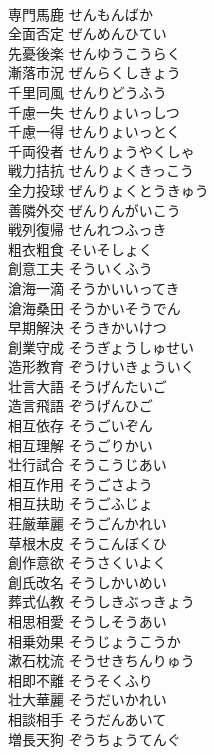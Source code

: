 \documentclass[8pt]{extreport}
\begin{document}
\begin{CJK}{UTF8}{min}
\\	専門馬鹿	せんもんばか	
\\	全面否定	ぜんめんひてい	
\\	先憂後楽	せんゆうこうらく	
\\	漸落市況	ぜんらくしきょう	
\\	千里同風	せんりどうふう	
\\	千慮一失	せんりょいっしつ	
\\	千慮一得	せんりょいっとく	
\\	千両役者	せんりょうやくしゃ	
\\	戦力拮抗	せんりょくきっこう	
\\	全力投球	ぜんりょくとうきゅう	
\\	善隣外交	ぜんりんがいこう	
\\	戦列復帰	せんれつふっき	
\\	粗衣粗食	そいそしょく	
\\	創意工夫	そういくふう	
\\	滄海一滴	そうかいいってき	
\\	滄海桑田	そうかいそうでん	
\\	早期解決	そうきかいけつ	
\\	創業守成	そうぎょうしゅせい	
\\	造形教育	ぞうけいきょういく	
\\	壮言大語	そうげんたいご	
\\	造言飛語	ぞうげんひご	
\\	相互依存	そうごいぞん	
\\	相互理解	そうごりかい	
\\	壮行試合	そうこうじあい	
\\	相互作用	そうごさよう	
\\	相互扶助	そうごふじょ	
\\	荘厳華麗	そうごんかれい	
\\	草根木皮	そうこんぼくひ	
\\	創作意欲	そうさくいよく	
\\	創氏改名	そうしかいめい	
\\	葬式仏教	そうしきぶっきょう	
\\	相思相愛	そうしそうあい	
\\	相乗効果	そうじょうこうか	
\\	漱石枕流	そうせきちんりゅう	
\\	相即不離	そうそくふり	
\\	壮大華麗	そうだいかれい	
\\	相談相手	そうだんあいて	
\\	増長天狗	ぞうちょうてんぐ	

\end{CJK}
\end{document}
